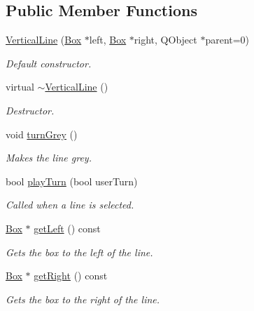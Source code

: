 \subsection*{\-Public \-Member \-Functions}
\begin{DoxyCompactItemize}
\item 
\hyperlink{classVerticalLine_a53b358b7ed8d9bbbaf7ee8b75e9a8665}{\-Vertical\-Line} (\hyperlink{classBox}{\-Box} $\ast$left, \hyperlink{classBox}{\-Box} $\ast$right, \-Q\-Object $\ast$parent=0)
\begin{DoxyCompactList}\small\item\em \-Default constructor. \end{DoxyCompactList}\item 
virtual \hyperlink{classVerticalLine_a925318f98ded156abcde65ccf60830d6}{$\sim$\-Vertical\-Line} ()
\begin{DoxyCompactList}\small\item\em \-Destructor. \end{DoxyCompactList}\item 
void \hyperlink{classVerticalLine_ae4ac7f318bec7b2ed7a90c1c31a3752d}{turn\-Grey} ()
\begin{DoxyCompactList}\small\item\em \-Makes the line grey. \end{DoxyCompactList}\item 
bool \hyperlink{classVerticalLine_ac90ef61324404c12668c73dc5567dc11}{play\-Turn} (bool user\-Turn)
\begin{DoxyCompactList}\small\item\em \-Called when a line is selected. \end{DoxyCompactList}\item 
\hyperlink{classBox}{\-Box} $\ast$ \hyperlink{classVerticalLine_a51e7a4f8a9f201ff3d4215373c1f9909}{get\-Left} () const 
\begin{DoxyCompactList}\small\item\em \-Gets the box to the left of the line. \end{DoxyCompactList}\item 
\hyperlink{classBox}{\-Box} $\ast$ \hyperlink{classVerticalLine_a6a7688ae8c09aca10a841874d8e835ea}{get\-Right} () const 
\begin{DoxyCompactList}\small\item\em \-Gets the box to the right of the line. \end{DoxyCompactList}\end{DoxyCompactItemize}


